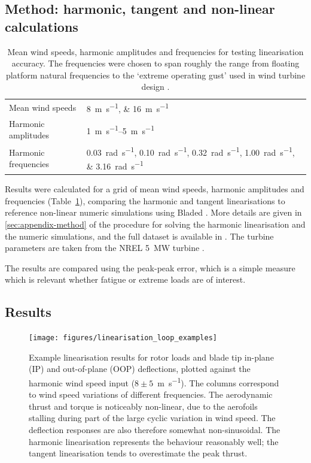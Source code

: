 \documentclass[preprint]{elsarticle}
\begin{document}
\subsection{Method: harmonic, tangent and non-linear calculations}

\begin{table}
  \centering
  \caption{Mean wind speeds, harmonic amplitudes and frequencies for testing
    linearisation accuracy. The frequencies were chosen to span roughly the
    range from floating platform natural frequencies to the `extreme operating
    gust' used in wind turbine design \citep{IEC_ed3}.}
  \label{tab:test-grid}
  \begin{tabular}{ll}
    \toprule
    Mean wind speeds & \SIlist{8;16}{\meter\per\second} \\
    Harmonic amplitudes & \SIrange{1}{5}{\meter\per\second} \\
    Harmonic frequencies & \SIlist{0.03;0.10;0.32;1.00;3.16}{\radian\per\second} \\
    \bottomrule
  \end{tabular}
\end{table}

Results were calculated for a grid of mean wind speeds, harmonic amplitudes and
frequencies (Table~\ref{tab:test-grid}), comparing the harmonic and tangent
linearisations to reference non-linear numeric simulations using Bladed
\citep{GarradHassan2011}. More details are given in \ref{sec:appendix-method} of
the procedure for solving the harmonic linearisation and the numeric
simulations, and the full dataset is available in \cite{lupton_2018_1484513}.
The turbine parameters are taken from the NREL \SI{5}{\mega\watt} turbine
\citep{Jonkman2009b}.

The results are compared using the peak-peak error, which is a simple measure
which is relevant whether fatigue or extreme loads are of interest.

\subsection{Results}
\label{sec:aero-results}

\begin{figure}
  \centering
  \hspace*{-1.5cm}\texttt{[image: figures/linearisation\_loop\_examples]}
  \caption{Example linearisation results for rotor loads and blade tip in-plane
    (IP) and out-of-plane (OOP) deflections, plotted against the harmonic wind
    speed input ($8 \pm 5$~\si{\metre\per\second}). The columns correspond to
    wind speed variations of different frequencies. The aerodynamic thrust and
    torque is noticeably non-linear, due to the aerofoils stalling during part of
    the large cyclic variation in wind speed. The deflection responses are also
    therefore somewhat non-sinusoidal. The harmonic linearisation represents the
    behaviour reasonably well; the tangent linearisation tends to overestimate
    the peak thrust.}
\label{fig:hlin-example-loops}
\end{figure}
\end{document}
